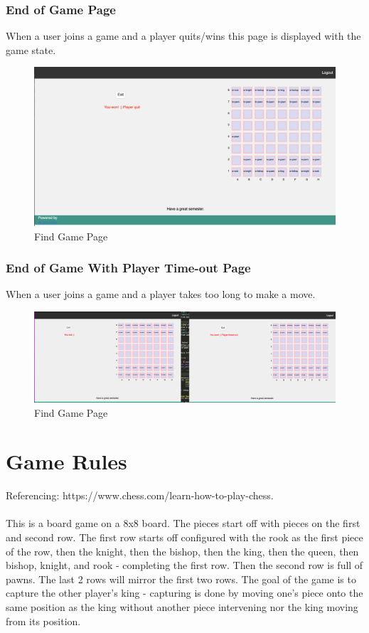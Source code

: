 \documentclass[12pt]{article}
\begin{document}
\subsubsection{End of Game Page}
When a user joins a game and a player quits/wins this page is displayed with the game state.
\begin{figure}[h!]
    \includegraphics[width=\linewidth]{PLAYER_WON_PLAYER_QUIT.png}
    \caption{Find Game Page}
\end{figure}

\subsubsection{End of Game With Player Time-out Page}
When a user joins a game and a player takes too long to make a move.
\begin{figure}[h!]
    \includegraphics[width=\linewidth]{PLAYER_TIMED_OUT.png}
    \caption{Find Game Page}
\end{figure}

\section{Game Rules}
Referencing: https://www.chess.com/learn-how-to-play-chess.\\\\
This is a board game on a 8x8 board. The pieces start off with pieces on the first and second row. The first row starts off configured with the rook as the first piece of the row, then the knight, then the bishop, then the king, then the queen, then bishop, knight, and rook - completing the first row. Then the second row is full of pawns. The last 2 rows will mirror the first two rows. The goal of the game is to capture the other player's king - capturing is done by moving one's piece onto the same position as the king without another piece intervening nor the king moving from its position.
\end{document}
